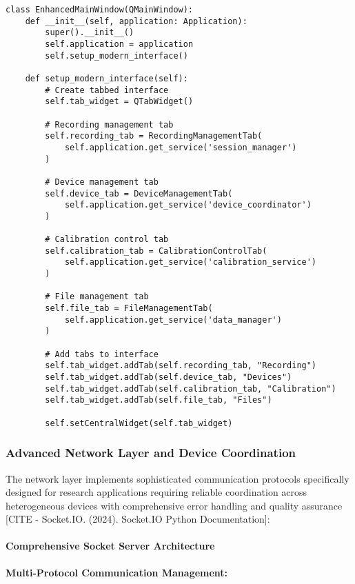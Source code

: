 \documentclass[12pt,a4paper]{article}
\begin{document}
\begin{verbatim}
class EnhancedMainWindow(QMainWindow):
    def __init__(self, application: Application):
        super().__init__()
        self.application = application
        self.setup_modern_interface()

    def setup_modern_interface(self):
        # Create tabbed interface
        self.tab_widget = QTabWidget()

        # Recording management tab
        self.recording_tab = RecordingManagementTab(
            self.application.get_service('session_manager')
        )

        # Device management tab
        self.device_tab = DeviceManagementTab(
            self.application.get_service('device_coordinator')
        )

        # Calibration control tab
        self.calibration_tab = CalibrationControlTab(
            self.application.get_service('calibration_service')
        )

        # File management tab
        self.file_tab = FileManagementTab(
            self.application.get_service('data_manager')
        )

        # Add tabs to interface
        self.tab_widget.addTab(self.recording_tab, "Recording")
        self.tab_widget.addTab(self.device_tab, "Devices")
        self.tab_widget.addTab(self.calibration_tab, "Calibration")
        self.tab_widget.addTab(self.file_tab, "Files")

        self.setCentralWidget(self.tab_widget)
\end{verbatim}

\subsubsection{Advanced Network Layer and Device Coordination}

The network layer implements sophisticated communication protocols specifically designed for research applications
requiring reliable coordination across heterogeneous devices with comprehensive error handling and quality
assurance [CITE - Socket.IO. (2024). Socket.IO Python Documentation]:

\paragraph{Comprehensive Socket Server Architecture}

\textbf{Multi-Protocol Communication Management:}
\end{document}
